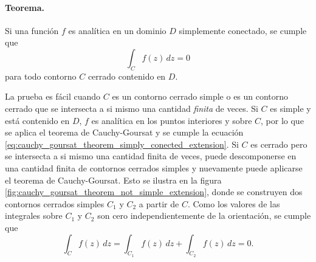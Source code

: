 \documentclass[a4paper]{report}
\begin{document}
\paragraph{Teorema.} Si una función \(f\) es analítica en un dominio \(D\) simplemente conectado, se cumple que 
\begin{equation}\label{eq:cauchy_goursat_theorem_simply_conected_extension}
 \int_Cf(z)\,dz=0 
\end{equation}
para todo contorno \(C\) cerrado contenido en \(D\).

La prueba es fácil cuando \(C\) es un contorno cerrado simple o es un contorno cerrado que se intersecta a si mismo una cantidad \emph{finita} de veces. Si \(C\) es simple y está contenido en \(D\), \(f\) es analítica en los puntos interiores y sobre \(C\), por lo que se aplica el teorema de Cauchy-Goursat y se cumple la ecuación \ref{eq:cauchy_goursat_theorem_simply_conected_extension}. Si \(C\) es cerrado pero se intersecta a si mismo una cantidad finita de veces, puede descomponerse en una cantidad finita de contornos cerrados simples y nuevamente puede aplicarse el teorema de Cauchy-Goursat. Esto se ilustra en la figura \ref{fig:cauchy_goursat_theorem_not_simple_extension}, donde se construyen dos contornos cerrados simples \(C_1\) y \(C_2\) a partir de \(C\). Como los valores de las integrales sobre \(C_1\) y \(C_2\) son cero independientemente de la orientación, se cumple que 
\[
 \int_Cf(z)\,dz=\int_{C_1}f(z)\,dz+\int_{C_2}f(z)\,dz=0.
\]
\end{document}
